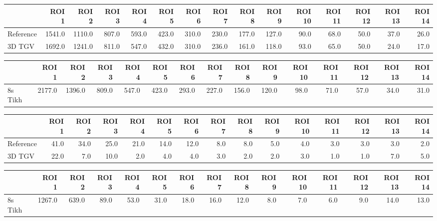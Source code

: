 \begin{tabular}{lrrrrrrrrrrrrrr}
\toprule
{} &   ROI 1 &   ROI 2 &  ROI 3 &  ROI 4 &  ROI 5 &  ROI 6 &  ROI 7 &  ROI 8 &  ROI 9 &  ROI 10 &  ROI 11 &  ROI 12 &  ROI 13 &  ROI 14 \\
\midrule
Reference &  1541.0 &  1110.0 &  807.0 &  593.0 &  423.0 &  310.0 &  230.0 &  177.0 &  127.0 &    90.0 &    68.0 &    50.0 &    37.0 &    26.0 \\
3D TGV    &  1692.0 &  1241.0 &  811.0 &  547.0 &  432.0 &  310.0 &  236.0 &  161.0 &  118.0 &    93.0 &    65.0 &    50.0 &    24.0 &    17.0 \\
\bottomrule
\end{tabular}
\begin{tabular}{lrrrrrrrrrrrrrr}
\toprule
{} &   ROI 1 &   ROI 2 &  ROI 3 &  ROI 4 &  ROI 5 &  ROI 6 &  ROI 7 &  ROI 8 &  ROI 9 &  ROI 10 &  ROI 11 &  ROI 12 &  ROI 13 &  ROI 14 \\
\midrule
8s Tikh &  2177.0 &  1396.0 &  809.0 &  547.0 &  423.0 &  293.0 &  227.0 &  156.0 &  120.0 &    98.0 &    71.0 &    57.0 &    34.0 &    31.0 \\
\bottomrule
\end{tabular}
\begin{tabular}{lrrrrrrrrrrrrrr}
\toprule
{} &  ROI 1 &  ROI 2 &  ROI 3 &  ROI 4 &  ROI 5 &  ROI 6 &  ROI 7 &  ROI 8 &  ROI 9 &  ROI 10 &  ROI 11 &  ROI 12 &  ROI 13 &  ROI 14 \\
\midrule
Reference &   41.0 &   34.0 &   25.0 &   21.0 &   14.0 &   12.0 &    8.0 &    8.0 &    5.0 &     4.0 &     3.0 &     3.0 &     3.0 &     2.0 \\
3D TGV    &   22.0 &    7.0 &   10.0 &    2.0 &    4.0 &    4.0 &    3.0 &    2.0 &    2.0 &     3.0 &     1.0 &     1.0 &     7.0 &     5.0 \\
\bottomrule
\end{tabular}
\begin{tabular}{lrrrrrrrrrrrrrr}
\toprule
{} &   ROI 1 &  ROI 2 &  ROI 3 &  ROI 4 &  ROI 5 &  ROI 6 &  ROI 7 &  ROI 8 &  ROI 9 &  ROI 10 &  ROI 11 &  ROI 12 &  ROI 13 &  ROI 14 \\
\midrule
8s Tikh &  1267.0 &  639.0 &   89.0 &   53.0 &   31.0 &   18.0 &   16.0 &   12.0 &    8.0 &     7.0 &     6.0 &     9.0 &    14.0 &    13.0 \\
\bottomrule
\end{tabular}
